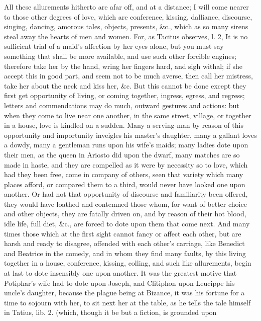 {All these allurements hitherto are afar off, and at a distance; I will
come nearer to those other degrees of love, which are conference,
kissing, dalliance, discourse, singing, dancing, amorous tales,
objects, presents, \&c., which as so many sirens steal away the hearts
of men and women. For, as Tacitus observes, l. 2, It is no
sufficient trial of a maid's affection by her eyes alone, but you must
say something that shall be more available, and use such other forcible
engines; therefore take her by the hand, wring her fingers hard, and
sigh withal; if she accept this in good part, and seem not to be much
averse, then call her mistress, take her about the neck and kiss her,
\&c. But this cannot be done except they first get opportunity of
living, or coming together, ingress, egress, and regress; letters and
commendations may do much, outward gestures and actions: but when they
come to live near one another, in the same street, village, or together
in a house, love is kindled on a sudden. Many a serving-man by reason
of this opportunity and importunity inveigles his master's daughter,
many a gallant loves a dowdy, many a gentleman runs upon his wife's
maids; many ladies dote upon their men, as the queen in Ariosto did
upon the dwarf, many matches are so made in haste, and they are
compelled as it were by necessity so to love, which had they been
free, come in company of others, seen that variety which many places
afford, or compared them to a third, would never have looked one upon
another. Or had not that opportunity of discourse and familiarity been
offered, they would have loathed and contemned those whom, for want of
better choice and other objects, they are fatally driven on, and by
reason of their hot blood, idle life, full diet, \&c., are forced to
dote upon them that come next. And many times those which at the first
sight cannot fancy or affect each other, but are harsh and ready to
disagree, offended with each other's carriage, like Benedict and
Beatrice in the comedy, and in whom they find many faults, by
this living together in a house, conference, kissing, colling, and such
like allurements, begin at last to dote insensibly one upon another.
It was the greatest motive that Potiphar's wife had to dote upon
Joseph, and Clitiphon upon Leucippe his uncle's daughter, because
the plague being at Bizance, it was his fortune for a time to sojourn
with her, to sit next her at the table, as he tells the tale himself in
Tatius, lib. 2. (which, though it be but a fiction, is grounded upon
}
